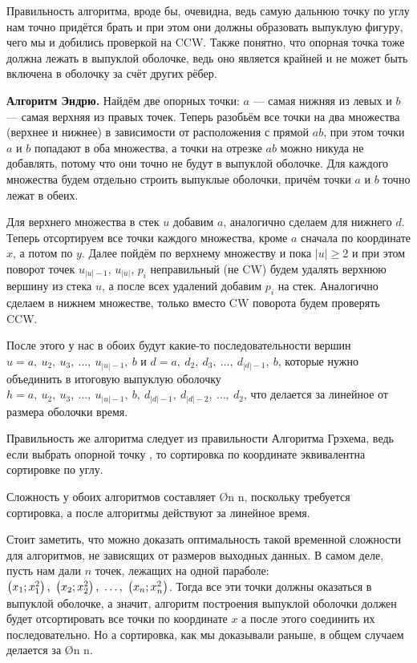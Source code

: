 Правильность алгоритма, вроде бы, очевидна, ведь самую дальнюю точку по углу нам точно придётся брать и при этом они должны образовать выпуклую фигуру, чего мы и добились проверкой на CCW. Также понятно, что опорная точка тоже должна лежать в выпуклой оболочке, ведь оно является крайней и не может быть включена в оболочку за счёт других рёбер.

\textbf{Алгоритм Эндрю.} Найдём две опорных точки: $a$ — самая нижняя из левых и $b$ — самая верхняя из правых точек. Теперь разобьём все точки на два множества (верхнее и нижнее) в зависимости от расположения с прямой $ab$, при этом точки $a$ и $b$ попадают в оба множества, а точки на отрезке $ab$ можно никуда не добавлять, потому что они точно не будут в выпуклой оболочке. Для каждого множества будем отдельно строить выпуклые оболочки, причём точки $a$ и $b$ точно лежат в обеих.

Для верхнего множества в стек $u$ добавим $a$, аналогично сделаем для нижнего $d$. Теперь отсортируем все точки каждого множества, кроме $a$ сначала по координате $x$, а потом по $y$. Далее пойдём по верхнему множеству и пока $|u| \geq 2$ и при этом поворот точек $u_{|u| - 1}$, $u_{|u|}$, $p_i$ неправильный (не CW) будем удалять верхнюю вершину из стека $u$, а после всех удалений добавим $p_i$ на стек. Аналогично сделаем в нижнем множестве, только вместо CW поворота будем проверять CCW. 

После этого у нас в обоих будут какие-то последовательности вершин $u = a,\ u_2,\ u_3,\ \ldots,\ u_{|u| - 1},\ b$ и $d = a,\ d_2,\ d_3,\ \ldots,\ d_{|d| - 1},\ b$, которые нужно объединить в итоговую выпуклую оболочку $h = a,\ u_2,\ u_3,\ \ldots,\ u_{|u| - 1},\ b,\ d_{|d| - 1}, \ d_{|d| - 2},\ \ldots,\ d_2$, что делается за линейное от размера оболочки время.

Правильность же алгоритма следует из правильности Алгоритма Грэхема, ведь если выбрать опорной точку , то сортировка по координате эквивалентна сортировке по углу.

Сложность у обоих алгоритмов составляет \O{n \log n}, поскольку требуется сортировка, а после алгоритмы действуют за линейное время.

Стоит заметить, что можно доказать оптимальность такой временной сложности для алгоритмов, не зависящих от размеров выходных данных. В самом деле, пусть нам дали $n$ точек, лежащих на одной параболе: $\pmath{x_1}{x_1^2},\ \pmath{x_2}{x_2^2},\ \ldots,\ \pmath{x_n}{x_n^2}$. Тогда все эти точки должны оказаться в выпуклой оболочке, а значит, алгоритм построения выпуклой оболочки должен будет отсортировать все точки по координате $x$ а после этого соединить их последовательно. Но а сортировка, как мы доказывали раньше, в общем случаем делается за \O{n \log n}.

